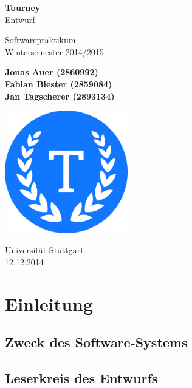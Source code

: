 \documentclass[11pt]{article}
\begin{document}
\begin{titlepage}
	\begin{center}
		\vspace*{1cm}

		\Huge
		\textbf{Tourney}\\
		Entwurf

		\vspace{0.5cm}
		\LARGE
		Softwarepraktikum\\
		\Large
		Wintersemester 2014/2015

		\vspace{1.5cm}

		\large
		\textbf{Jonas Auer (2860992)\\
				 Fabian Biester (2859084)\\
				 Jan Tagscherer (2893134)}

		\vfill

		\includegraphics[width=0.4\textwidth]{Logo.png}

		\vspace{1.5cm}

		\Large
		Universität Stuttgart\\
		12.12.2014
	\end{center}
\end{titlepage}

\newpage

\tableofcontents

\section{Einleitung}

\subsection{Zweck des Software-Systems}

\subsection{Leserkreis des Entwurfs}
\end{document}
